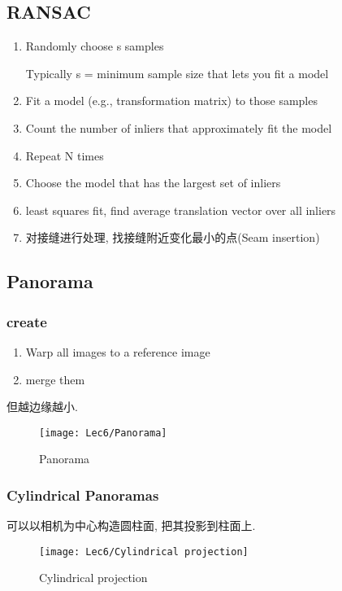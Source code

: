 \subsection{RANSAC}
\begin{enumerate}
    \item Randomly choose s samples
    
    Typically s = minimum sample size that lets you fit a model
    \item Fit a model (e.g., transformation matrix) to those samples
    \item Count the number of inliers that approximately fit the model
    \item Repeat N times
    \item Choose the model that has the largest set of inliers
    \item least squares fit, find average translation vector over all inliers    
    \item 对接缝进行处理, 找接缝附近变化最小的点(Seam insertion)
\end{enumerate}

\subsection{Panorama}
\subsubsection{create}
\begin{enumerate}
    \item Warp all images to a reference image
    \item merge them
\end{enumerate}

但越边缘越小. 

\begin{figure}[H]
    \centering
    \texttt{[image: Lec6/Panorama]}
    \caption{Panorama}
\end{figure}

\subsubsection{Cylindrical Panoramas}

可以以相机为中心构造圆柱面, 把其投影到柱面上. 

\begin{figure}[H]
    \centering
    \texttt{[image: Lec6/Cylindrical projection]}
    \caption{Cylindrical projection}
\end{figure}

